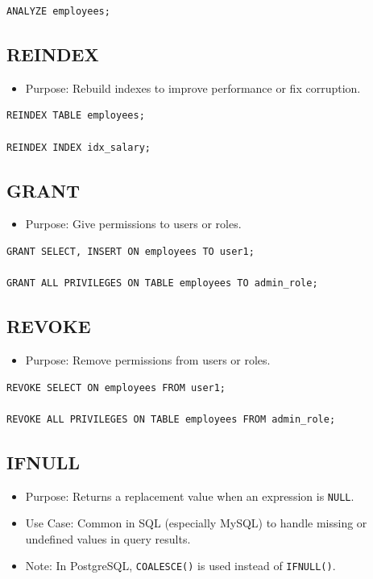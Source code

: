 \documentclass[10pt]{article}
\begin{document}
\begin{verbatim}
ANALYZE employees;
\end{verbatim}

\subsection{REINDEX}
\begin{itemize}
    \item Purpose: Rebuild indexes to improve performance or fix corruption.
\end{itemize}

\begin{verbatim}
REINDEX TABLE employees;

REINDEX INDEX idx_salary;
\end{verbatim}

\subsection{GRANT}
\begin{itemize}
    \item Purpose: Give permissions to users or roles.
\end{itemize}

\begin{verbatim}
GRANT SELECT, INSERT ON employees TO user1;

GRANT ALL PRIVILEGES ON TABLE employees TO admin_role;
\end{verbatim}

\subsection{REVOKE}
\begin{itemize}
    \item Purpose: Remove permissions from users or roles.
\end{itemize}

\begin{verbatim}
REVOKE SELECT ON employees FROM user1;

REVOKE ALL PRIVILEGES ON TABLE employees FROM admin_role;
\end{verbatim}

\subsection{IFNULL}
\begin{itemize}
    \item Purpose: Returns a replacement value when an expression is \texttt{NULL}.
    \item Use Case: Common in SQL (especially MySQL) to handle missing or undefined values in query results.
    \item Note: In PostgreSQL, \texttt{COALESCE()} is used instead of \texttt{IFNULL()}.
\end{itemize}
\end{document}
